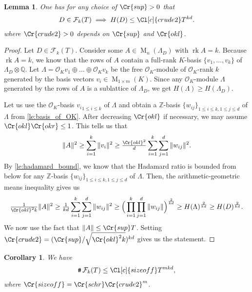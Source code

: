 \documentclass{amsart}
\newtheorem{corollary}[theorem]{Corollary}
\newtheorem{lemma}[theorem]{Lemma}
\theoremstyle{definition}
\theoremstyle{remark}
\newcommand{\OK}{\mathcal{O}_K}
\newcommand{\KR}{K_\mathbb{R}}
\DeclareMathOperator{\M}{M}
\DeclareMathOperator{\card}{\texttt{\#}}
\DeclareMathOperator{\rank}{rk}
\begin{document}
\begin{lemma}
    \label{le:crude_early}
    One has for any choice of $\Cr{sup} > 0$ that 
    \begin{equation}
        D \in \mathcal{F}_{k}(T)  \implies  H(D) \leq \Cl[c]{crude2} T^{kd}.
    \end{equation}
    where $\Cr{crude2}>0$ depends on $\Cr{sup}$ and $\Cr{okl}$.
\end{lemma}
\begin{proof}
    Let $D \in \mathcal{F}_{k}(T)$. Consider some $A \in \M_{n}(\Lambda_{D})$
    with $\rank A  = k$. 
    Because $\rank A = k$, we know that the rows of $A$ contain a full-rank $K$-basis $\{v_{1},\dots,v_{k}\}$ of $\Lambda_{D} \otimes \mathbb{Q}$. 
    Let $\Lambda = \OK v_{1} \oplus \dots \oplus \OK v_{k}$ be the free $\OK$-module of $\OK$-rank $k$ generated by the basis vectors $v_{i} \in \M_{1 \times m}(K)$.
    Since any $\OK$-module $\Lambda$ generated by the rows of $A$ is a sublattice of $\Lambda_{D}$, we get $H(\Lambda) \geq H(\Lambda_{D})$. 

    Let us use the $\OK$-basis ${v_{i}}_{1 \leq i \leq k}$ of $\Lambda$ and obtain a $\mathbb{Z}$-basis $\{w_{ij}\}_{ {1 \leq i \leq k, 1 \leq j \leq d }}$
    of $\Lambda$ from \cref{le:basis_of_OK}. 
      After decreasing $\Cr{okl}$ if necessary, we may assume
  $\Cr{okl}\Cr{okr}\leq 1$.
    This tells us that 
    \begin{equation}
        \|A\|^{2} \geq \sum_{i=1}^{k} \|v_{i}\|^{2} \geq  \tfrac{\Cr{okl}^{2}}{d}\sum_{i=1}^{k}\sum_{j=1}^{d} \|w_{ij}\|^{2}.
    \end{equation}
    By \cref{le:hadamard_bound}, we know that the Hadamard ratio is bounded 
    from below for any $\mathbb{Z}$-basis $\{w_{ij}\}_{1 \leq i \leq k, 1 \leq j \leq d}$ of $\Lambda$.
    Then, the arithmetic-geometric means inequality gives us
    \begin{equation}
        \tfrac{1}{\Cr{okl}^{2} k }\|A\|^{2} \geq \tfrac{1}{kd}\sum_{i=1}^{k} \sum_{j=1}^{d} \|w_{ij}\|^{2} \geq  \Big( \prod_{i=1}^{k} \prod_{j=1}^{d} \|w_{ij}\|\Big)^{\frac{2}{kd}} \geq H(\Lambda)^{\frac{2}{kd}} \geq H(D)^{\frac{2}{kd}}.
    \end{equation}
    We now use the fact that $\|A\| \leq \Cr{sup} T$. Setting $\Cr{crude2} = ({\Cr{sup}/\sqrt{\Cr{okl}^{2} k}})^{kd} $ gives us the statement. 
\end{proof}
\begin{corollary}
    \label{co:counting_matrices}
    We have
    \begin{equation}
        \card \mathcal{F}_{k}(T) \leq  \Cl[c]{sizeoff} T^{mkd},
    \end{equation}
    where $\Cr{sizeoff} = \Cr{schr}\Cr{crude2}^{m}$.
\end{corollary}
\end{document}
